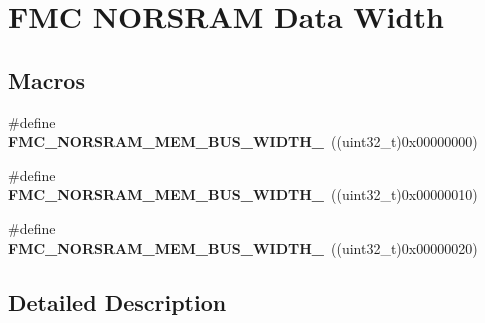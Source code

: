 \hypertarget{group___f_m_c___n_o_r_s_r_a_m___data___width}{}\section{F\+MC N\+O\+R\+S\+R\+AM Data Width}
\label{group___f_m_c___n_o_r_s_r_a_m___data___width}
\subsection*{Macros}
\begin{DoxyCompactItemize}
\item 
\#define {\bfseries F\+M\+C\+\_\+\+N\+O\+R\+S\+R\+A\+M\+\_\+\+M\+E\+M\+\_\+\+B\+U\+S\+\_\+\+W\+I\+D\+T\+H\+\_}~((uint32\+\_\+t)0x00000000)\hypertarget{group___f_m_c___n_o_r_s_r_a_m___data___width_gabfc59a8d291d1cc049e657d021ead97c}{}\label{group___f_m_c___n_o_r_s_r_a_m___data___width_gabfc59a8d291d1cc049e657d021ead97c}

\item 
\#define {\bfseries F\+M\+C\+\_\+\+N\+O\+R\+S\+R\+A\+M\+\_\+\+M\+E\+M\+\_\+\+B\+U\+S\+\_\+\+W\+I\+D\+T\+H\+\_}~((uint32\+\_\+t)0x00000010)\hypertarget{group___f_m_c___n_o_r_s_r_a_m___data___width_gab170b7221689e0db870c4173331ead46}{}\label{group___f_m_c___n_o_r_s_r_a_m___data___width_gab170b7221689e0db870c4173331ead46}

\item 
\#define {\bfseries F\+M\+C\+\_\+\+N\+O\+R\+S\+R\+A\+M\+\_\+\+M\+E\+M\+\_\+\+B\+U\+S\+\_\+\+W\+I\+D\+T\+H\+\_}~((uint32\+\_\+t)0x00000020)\hypertarget{group___f_m_c___n_o_r_s_r_a_m___data___width_ga705a55384cfbc4ff4492708a4efad6a3}{}\label{group___f_m_c___n_o_r_s_r_a_m___data___width_ga705a55384cfbc4ff4492708a4efad6a3}

\end{DoxyCompactItemize}


\subsection{Detailed Description}
